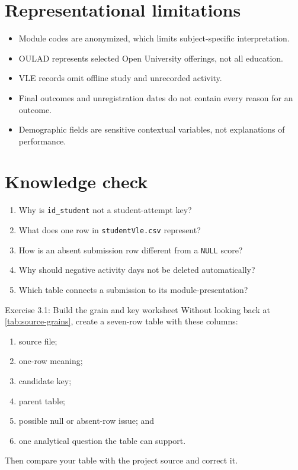 \section{Representational limitations}

\begin{itemize}
  \item Module codes are anonymized, which limits subject-specific
    interpretation.
  \item OULAD represents selected Open University offerings, not all education.
  \item VLE records omit offline study and unrecorded activity.
  \item Final outcomes and unregistration dates do not contain every reason for
    an outcome.
  \item Demographic fields are sensitive contextual variables, not explanations
    of performance.
\end{itemize}

\section{Knowledge check}

\begin{enumerate}
  \item Why is \texttt{id\_student} not a student-attempt key?
  \item What does one row in \texttt{studentVle.csv} represent?
  \item How is an absent submission row different from a \texttt{NULL} score?
  \item Why should negative activity days not be deleted automatically?
  \item Which table connects a submission to its module-presentation?
\end{enumerate}

\begin{exercisebox}{Exercise 3.1: Build the grain and key worksheet}
Without looking back at \cref{tab:source-grains}, create a seven-row table with
these columns:
\begin{enumerate}
  \item source file;
  \item one-row meaning;
  \item candidate key;
  \item parent table;
  \item possible null or absent-row issue; and
  \item one analytical question the table can support.
\end{enumerate}
Then compare your table with the project source and correct it.
\end{exercisebox}

